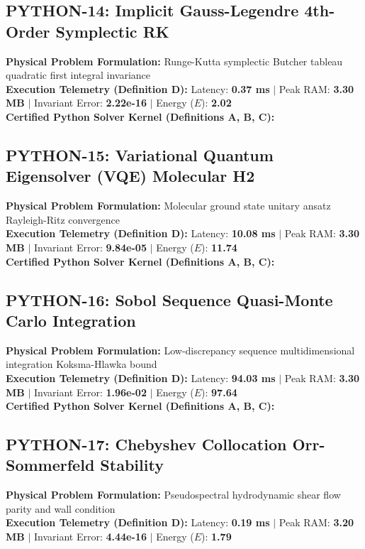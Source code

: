 \vspace{1em}
\subsection{PYTHON-14: Implicit Gauss-Legendre 4th-Order Symplectic RK}
\textbf{Physical Problem Formulation:} Runge-Kutta symplectic Butcher tableau quadratic first integral invariance\\
\textbf{Execution Telemetry (Definition D):} Latency: \textbf{0.37 ms} $|$ Peak RAM: \textbf{3.30 MB} $|$ Invariant Error: \textbf{2.22e-16} $|$ Energy ($E$): \textbf{2.02}\\

\textbf{Certified Python Solver Kernel (Definitions A, B, C):}


\vspace{1em}
\subsection{PYTHON-15: Variational Quantum Eigensolver (VQE) Molecular H2}
\textbf{Physical Problem Formulation:} Molecular ground state unitary ansatz Rayleigh-Ritz convergence\\
\textbf{Execution Telemetry (Definition D):} Latency: \textbf{10.08 ms} $|$ Peak RAM: \textbf{3.30 MB} $|$ Invariant Error: \textbf{9.84e-05} $|$ Energy ($E$): \textbf{11.74}\\

\textbf{Certified Python Solver Kernel (Definitions A, B, C):}


\vspace{1em}
\subsection{PYTHON-16: Sobol Sequence Quasi-Monte Carlo Integration}
\textbf{Physical Problem Formulation:} Low-discrepancy sequence multidimensional integration Koksma-Hlawka bound\\
\textbf{Execution Telemetry (Definition D):} Latency: \textbf{94.03 ms} $|$ Peak RAM: \textbf{3.30 MB} $|$ Invariant Error: \textbf{1.96e-02} $|$ Energy ($E$): \textbf{97.64}\\

\textbf{Certified Python Solver Kernel (Definitions A, B, C):}


\vspace{1em}
\subsection{PYTHON-17: Chebyshev Collocation Orr-Sommerfeld Stability}
\textbf{Physical Problem Formulation:} Pseudospectral hydrodynamic shear flow parity and wall condition\\
\textbf{Execution Telemetry (Definition D):} Latency: \textbf{0.19 ms} $|$ Peak RAM: \textbf{3.20 MB} $|$ Invariant Error: \textbf{4.44e-16} $|$ Energy ($E$): \textbf{1.79}\\

